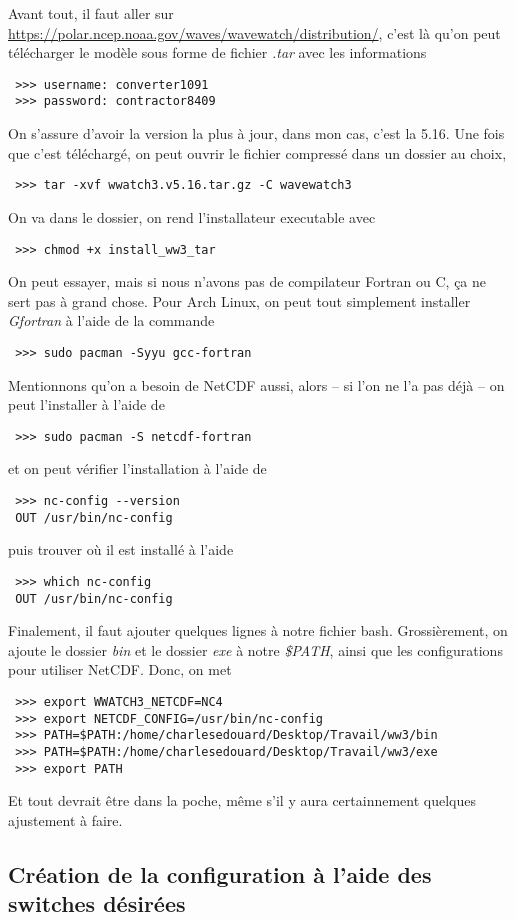 \documentclass[10pt]{article}
\numberwithin{equation}{section}
\begin{document}
Avant tout, il faut aller sur \url{https://polar.ncep.noaa.gov/waves/wavewatch/distribution/}, c'est là qu'on peut télécharger le modèle sous forme de fichier \emph{.tar} avec les informations
\begin{verbatim}
 >>> username: converter1091
 >>> password: contractor8409
\end{verbatim}
On s'assure d'avoir la version la plus à jour, dans mon cas, c'est la 5.16. Une fois que c'est téléchargé, on peut ouvrir le fichier compressé dans un dossier au choix,
\begin{verbatim}
 >>> tar -xvf wwatch3.v5.16.tar.gz -C wavewatch3
\end{verbatim}
On va dans le dossier, on rend l'installateur executable avec
\begin{verbatim}
 >>> chmod +x install_ww3_tar 
\end{verbatim}
On peut essayer, mais si nous n'avons pas de compilateur Fortran ou C, ça ne sert pas à grand chose. Pour Arch Linux, on peut tout simplement installer \emph{Gfortran} à l'aide de la commande
\begin{verbatim}
 >>> sudo pacman -Syyu gcc-fortran
\end{verbatim}
Mentionnons qu'on a besoin de NetCDF aussi, alors -- si l'on ne l'a pas déjà -- on peut l'installer à l'aide de
\begin{verbatim}
 >>> sudo pacman -S netcdf-fortran 
\end{verbatim}
et on peut vérifier l'installation à l'aide de
\begin{verbatim}
 >>> nc-config --version
 OUT /usr/bin/nc-config
\end{verbatim}
puis trouver où il est installé à l'aide
\begin{verbatim}
 >>> which nc-config
 OUT /usr/bin/nc-config
\end{verbatim}
Finalement, il faut ajouter quelques lignes à notre fichier bash. Grossièrement, on ajoute le dossier \emph{bin} et le dossier \emph{exe} à notre \emph{\$PATH}, ainsi que les configurations pour utiliser NetCDF. Donc, on met
\begin{verbatim}
 >>> export WWATCH3_NETCDF=NC4
 >>> export NETCDF_CONFIG=/usr/bin/nc-config
 >>> PATH=$PATH:/home/charlesedouard/Desktop/Travail/ww3/bin
 >>> PATH=$PATH:/home/charlesedouard/Desktop/Travail/ww3/exe
 >>> export PATH
\end{verbatim}
Et tout devrait être dans la poche, même s'il y aura certainnement quelques ajustement à faire.
\subsection{Création de la configuration à l'aide des switches désirées}
\label{sec:orge3896af}
\end{document}
